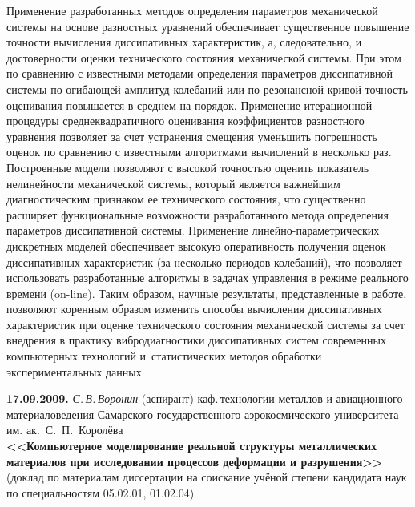 {Применение разработанных методов определения параметров механической системы на основе разностных уравнений обеспечивает существенное повышение точности вычисления диссипативных характеристик, а, следовательно, и достоверности оценки технического состояния механической системы. При этом по сравнению с известными методами определения параметров диссипативной системы по огибающей амплитуд колебаний или по резонансной кривой точность оценивания повышается  в среднем на порядок. Применение итерационной процедуры среднеквадратичного оценивания коэффициентов разностного уравнения позволяет за счет устранения смещения уменьшить погрешность оценок по сравнению с известными алгоритмами вычислений в несколько раз. 
Построенные модели позволяют с высокой точностью оценить показатель нелинейности механической системы, который является важнейшим диагностическим признаком ее технического состояния, что существенно расширяет функциональные возможности разработанного метода определения параметров диссипативной системы. Применение линейно-параметрических дискретных моделей обеспечивает высокую оперативность получения оценок диссипативных характеристик (за несколько периодов колебаний), что позволяет использовать разработанные алгоритмы в задачах управления в режиме реального времени (on-line).
Таким образом, научные результаты, представленные в работе, позволяют коренным образом изменить способы вычисления диссипативных характеристик при оценке технического состояния механической системы за счет внедрения в практику вибродиагностики диссипативных систем современных компьютерных технологий и~статистических методов обработки экспериментальных данных

}



\bigskip

\noindent
{\bf 17.09.2009.} {\it С.\,В.\,Воронин} {\footnotesize (аспирант) каф.\,технологии металлов и авиационного материа\-ловедения  Самарского государственного аэрокосмического университета им. ак.~С.~П.~Королёва} \\
{\bf <<Компьютерное моделирование реальной структуры металлических материалов при исследовании процессов деформации и разрушения>> } {\footnotesize (доклад по материалам диссертации на соискание учёной степени кандидата наук по специальностям 05.02.01, 01.02.04)}

\smallskip

